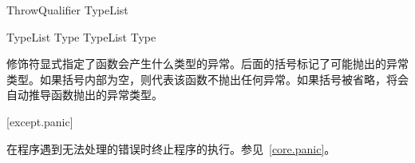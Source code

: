\begin{bnf}{ThrowQualifier}
     \terminal{(} TypeList\bnfs \terminal{)} \br
\end{bnf}

\begin{bnf}{TypeList}
    Type \br
    TypeList \terminal{,} Type
\end{bnf}

\pnum
{}修饰符显式指定了函数会产生什么类型的异常。后面的括号标记了可能抛出的异常类型。如果括号内部为空，则代表该函数不抛出任何异常。如果括号被省略，将会自动推导函数抛出的异常类型。

[except.panic]{}

\pnum
{}在程序遇到无法处理的错误时终止程序的执行。参见~\ref{core.panic}。